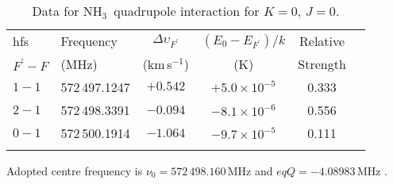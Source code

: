 \documentclass{aa}
\newcommand{\kms}{km\,s$^{-1}$}       %
\newcommand{\ammonia}{{\rm NH}$_3$}
\newcommand{\ettnoll}{{\rm NH}$_3\,(1_0 - 0_0)$}
\begin{document}
\begin{table}
\begin{flushleft}
 \caption{\label{hfs_data} Data for \ammonia\ quadrupole interaction for $K=0,\,J=0$.}
\begin{tabular}{llcccl}
\hline\hline
\noalign{\smallskip}
hfs                             & Frequency             & $\Delta \upsilon_{F^{\prime}}$         & $(E_0 - E_{F^{\prime}})/k$    &Relative                \\ 
$F^{\prime} - F$        & (MHz)                      & (\kms)                                                   &    (K)                                          & Strength       \\
\noalign{\smallskip}    
\hline
\noalign{\smallskip}    
$1 -1$                  & 572\,497.1247         & \phantom{1}$+0.542$                   &$+ 5.0 \times 10^{-5}$             & 0.333    \\
$2 -1$                  & 572\,498.3391 & \phantom{1}$-0.094$                   &$- 8.1 \times 10^{-6}$             & 0.556     \\
$0 -1$                   & 572\,500.1914        & \phantom{1}$-1.064$                   & $- 9.7 \times 10^{-5}$          & 0.111     \\  
\noalign{\smallskip}
\hline
  \noalign{\smallskip}
\noalign{\smallskip}    
\end{tabular}
Adopted centre frequency is $\nu_0 = 572\,498.160$\,MHz and $eqQ = - 4.08983$\,MHz \citep{cazzoli2009}.  
\end{flushleft}
\end{table}

 \begin{figure*}
  \caption{{\bf Left:} Rotational energy levels of \ammonia\ \citep[see the LAMDA data bank,][]{schoier2005}. Energies up to 800\,K are given for the ortho-\ammonia\ states ($K=0$ or $K=$ multiple of 3), whereas these are roughly half for para-\ammonia\ ($K \ne 0$ and $K\ne$ multiple of 3). All levels are plotted to scale, rendering the inversion splittings unresolved. {\bf Middle:} Same as left frame, but for energies below 100\,K. For symmetry reasons, half of the inversion levels do not exist for $K=0$. In this panel, the inversion levels, shown to scale, are resolved. {\bf Right:}  Hyperfine splitting, due to quadrupole interaction, of the $(J=1,\,K=0)$ level is shown. The resulting shifts, in \kms, for the \ettnoll\ line are indicated next to the components. The drawing is to scale and energies are in milli-Kelvin. 
  }
  \label{E_lev}
\end{figure*}
\end{document}
